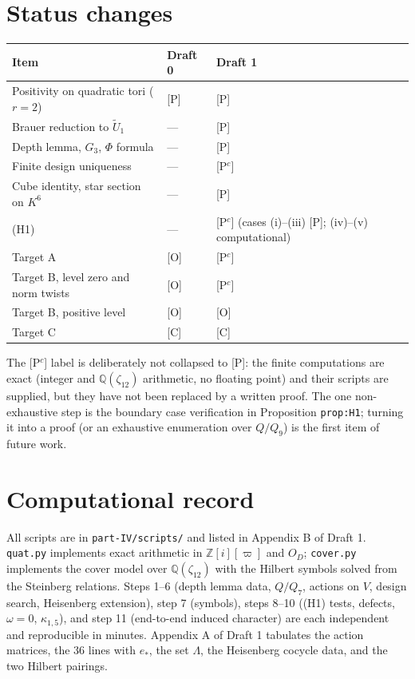 \documentclass[11pt]{article}
\newcommand{\Q}{\mathbb Q}
\newcommand{\Z}{\mathbb Z}
\begin{document}
\section*{Status changes}
\begin{center}
\begin{tabular}{lll}
\toprule
Item & Draft 0 & Draft 1\\
\midrule
Positivity on quadratic tori ($r=2$) & [P] & [P]\\
Brauer reduction to $\tilde U_1$ & --- & [P]\\
Depth lemma, $G_3$, $\Phi$ formula & --- & [P]\\
Finite design uniqueness & --- & [P$^c$]\\
Cube identity, star section on $K^6$ & --- & [P]\\
(H1) & --- & [P$^c$] (cases (i)--(iii) [P]; (iv)--(v) computational)\\
Target A & [O] & [P$^c$]\\
Target B, level zero and norm twists & [O] & [P$^c$]\\
Target B, positive level & [O] & [O]\\
Target C & [C] & [C]\\
\bottomrule
\end{tabular}
\end{center}
The [P$^c$] label is deliberately not collapsed to [P]: the finite
computations are exact (integer and $\Q(\zeta_{12})$ arithmetic, no
floating point) and their scripts are supplied, but they have not been
replaced by a written proof.  The one non-exhaustive step is the boundary
case verification in Proposition \texttt{prop:H1}; turning it into a proof
(or an exhaustive enumeration over $Q/Q_9$) is the first item of future
work.

\section*{Computational record}
All scripts are in \texttt{part-IV/scripts/} and listed in Appendix B of
Draft 1.  \texttt{quat.py} implements exact arithmetic in
$\Z[i][\varpi]$ and $O_D$; \texttt{cover.py} implements the cover model
over $\Q(\zeta_{12})$ with the Hilbert symbols solved from the Steinberg
relations.  Steps 1--6 (depth lemma data, $Q/Q_7$, actions on $V$, design
search, Heisenberg extension), step 7 (symbols), steps 8--10 ((H1) tests,
defects, $\omega=0$, $\kappa_{1,5}$), and step 11 (end-to-end induced
character) are each independent and reproducible in minutes.  Appendix A of
Draft 1 tabulates the action matrices, the $36$ lines with $e_*$, the set
$\Lambda$, the Heisenberg cocycle data, and the two Hilbert pairings.
\end{document}
